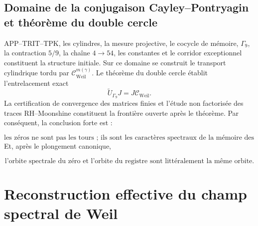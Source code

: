 \subsection{Domaine de la conjugaison Cayley–Pontryagin et théorème du double cercle}
APP–TRIT–TPK, les cylindres, la mesure projective, le cocycle de mémoire, \(\Gamma_9\), la contraction \(5/9\), la chaîne \(4\to54\), les constantes et le corridor exceptionnel constituent la structure initiale. Sur ce domaine se construit le transport cylindrique tordu par \(\mathcal C_{\mathrm{Weil}}^{m(\gamma)}\). Le théorème du double cercle établit l'entrelacement exact
  \[
  \widetilde U_{\Gamma_9}J
  =
  J\mathcal C_{\mathrm{Weil}}.
  \]
La certification de convergence des matrices finies et l'étude non factorisée des traces RH–Moonshine constituent la frontière ouverte après le théorème.
Par conséquent, la conclusion forte est :\par
\[
\boxed{
\text{les zéros ne sont pas les tours ;
ils sont les caractères spectraux de la mémoire des tours.}
}
\]
Et, après le plongement canonique,\par
\[
\boxed{
\text{l'orbite spectrale du zéro et l'orbite du registre sont littéralement la même orbite.}
}
\]

\section{Reconstruction effective du champ spectral de Weil}
